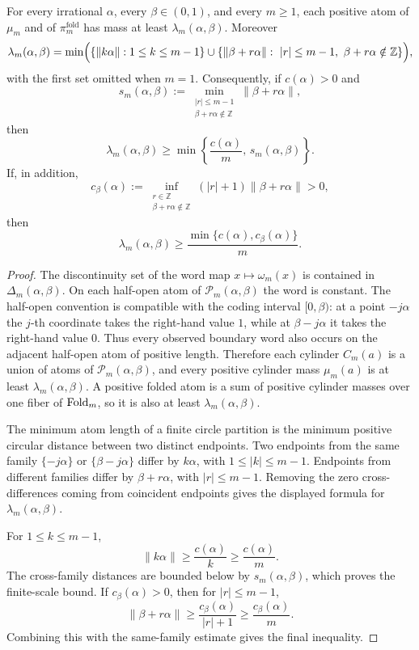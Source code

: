 \begin{proposition}\label{prop:general-window-atom-separation}
For every irrational \(\alpha\), every \(\beta\in(0,1)\), and every
\(m\ge1\), each positive atom of \(\mu_m\) and of
\(\pi_m^{\mathrm{fold}}\) has mass at least
\(\lambda_m(\alpha,\beta)\).  Moreover
\[
\lambda_m(\alpha,\beta)
=
\min\Bigl(
\{\|k\alpha\|:1\le k\le m-1\}
\cup
\{\|\beta+r\alpha\|:\ |r|\le m-1,\ \beta+r\alpha\notin\mathbb Z\}
\Bigr),
\]
with the first set omitted when \(m=1\).  Consequently, if
\(c(\alpha)>0\) and
\[
s_m(\alpha,\beta)
:=
\min_{\substack{|r|\le m-1\\ \beta+r\alpha\notin\mathbb Z}}
\|\beta+r\alpha\|,
\]
then
\[
\lambda_m(\alpha,\beta)\ge
\min\left\{\frac{c(\alpha)}{m},\,s_m(\alpha,\beta)\right\}.
\]
If, in addition,
\[
c_\beta(\alpha):=
\inf_{\substack{r\in\mathbb Z\\ \beta+r\alpha\notin\mathbb Z}}
(|r|+1)\|\beta+r\alpha\|>0,
\]
then
\[
\lambda_m(\alpha,\beta)
\ge
\frac{\min\{c(\alpha),c_\beta(\alpha)\}}{m}.
\]
\end{proposition}

\begin{proof}
The discontinuity set of the word map \(x\mapsto\omega_m(x)\) is contained in
\(\Delta_m(\alpha,\beta)\).  On each half-open atom of
\(\mathcal P_m(\alpha,\beta)\) the word is constant.  The half-open convention
is compatible with the coding interval \([0,\beta)\): at a point
\(-j\alpha\) the \(j\)-th coordinate takes the right-hand value \(1\), while at
\(\beta-j\alpha\) it takes the right-hand value \(0\).  Thus every observed
boundary word also occurs on the adjacent half-open atom of positive length.
Therefore each cylinder \(C_m(a)\) is a union of atoms of
\(\mathcal P_m(\alpha,\beta)\), and every positive cylinder mass
\(\mu_m(a)\) is at least \(\lambda_m(\alpha,\beta)\).  A positive folded atom
is a sum of positive cylinder masses over one fiber of \(\mathrm{Fold}_m\), so it is
also at least \(\lambda_m(\alpha,\beta)\).

The minimum atom length of a finite circle partition is the minimum positive
circular distance between two distinct endpoints.  Two endpoints from the same
family \(\{-j\alpha\}\) or \(\{\beta-j\alpha\}\) differ by \(k\alpha\), with
\(1\le |k|\le m-1\).  Endpoints from different families differ by
\(\beta+r\alpha\), with \(|r|\le m-1\).  Removing the zero cross-differences
coming from coincident endpoints gives the displayed formula for
\(\lambda_m(\alpha,\beta)\).

For \(1\le k\le m-1\),
\[
\|k\alpha\|\ge \frac{c(\alpha)}{k}\ge \frac{c(\alpha)}{m}.
\]
The cross-family distances are bounded below by \(s_m(\alpha,\beta)\), which
proves the finite-scale bound.  If \(c_\beta(\alpha)>0\), then for
\(|r|\le m-1\),
\[
\|\beta+r\alpha\|
\ge \frac{c_\beta(\alpha)}{|r|+1}
\ge \frac{c_\beta(\alpha)}{m}.
\]
Combining this with the same-family estimate gives the final inequality.
\end{proof}

